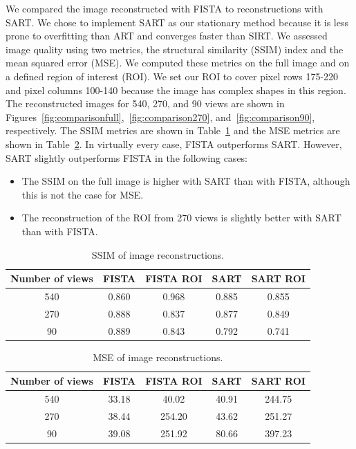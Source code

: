 \documentclass[12pt]{article}
\newcommand{\noin}{\noindent}
\begin{document}
\noin We compared the image reconstructed with FISTA to reconstructions with SART. We chose to implement SART as our stationary method because it is less prone to overfitting than ART and converges faster than SIRT. We assessed image quality using two metrics, the structural similarity (SSIM) index and the mean squared error (MSE). We computed these metrics on the full image and on a defined region of interest (ROI). We set our ROI to cover pixel rows 175-220 and pixel columns 100-140 because the image has complex shapes in this region. The reconstructed images for 540, 270, and 90 views are shown in Figures~\ref{fig:comparisonfull},~\ref{fig:comparison270}, and~\ref{fig:comparison90}, respectively. The SSIM metrics are shown in Table~\ref{tab:ssim} and the MSE metrics are shown in Table~\ref{tab:mse}. In virtually every case, FISTA outperforms SART. However, SART slightly outperforms FISTA in the following cases:
\begin{itemize}
	\item The SSIM on the full image is higher with SART than with FISTA, although this is not the case for MSE.
	\item The reconstruction of the ROI from 270 views is slightly better with SART than with FISTA.
\end{itemize}

\begin{table}[h]
	\centering
	\begin{tabular}{|c|c|c|c|c|}
		\hline
		\textbf{Number of views} & \textbf{FISTA} & \textbf{FISTA ROI} & \textbf{SART} & \textbf{SART ROI} \\
		\hline
		540 & 0.860 & 0.968 & 0.885 & 0.855 \\
		270 & 0.888 & 0.837 & 0.877 & 0.849 \\
		90  & 0.889 & 0.843 & 0.792 & 0.741 \\
		\hline
	\end{tabular}
	\caption{SSIM of image reconstructions.}
	\label{tab:ssim}
\end{table}

\begin{table}[h]
	\centering
	\begin{tabular}{|c|c|c|c|c|}
		\hline
		\textbf{Number of views} & \textbf{FISTA} & \textbf{FISTA ROI} & \textbf{SART} & \textbf{SART ROI} \\
		\hline
		540 & 33.18 &  40.02 & 40.91 & 244.75 \\
		270 & 38.44 & 254.20 & 43.62 & 251.27 \\
		90  & 39.08 & 251.92 & 80.66 & 397.23 \\
		\hline
	\end{tabular}
	\caption{MSE of image reconstructions.}
	\label{tab:mse}
\end{table}
\end{document}
